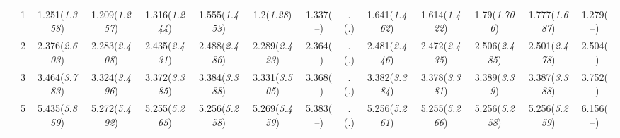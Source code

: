 \documentclass{article}
\begin{document}
\begin{table}[tbp]
{\begin{tabularx}{\textwidth}{lCCCCCCCCCCCCC}
&1&1.251\newline (\emph{1.358})&1.209\newline (\emph{1.257})&1.316\newline (\emph{1.244})&1.555\newline (\emph{1.453})&1.2\newline (\emph{1.28})&1.337\newline (--)&.\newline (\emph{.})&1.641\newline (\emph{1.462})&1.614\newline (\emph{1.422})&1.79\newline (\emph{1.706})&1.777\newline (\emph{1.687})&1.279\newline (--) \tabularnewline
&2&2.376\newline (\emph{2.603})&2.283\newline (\emph{2.408})&2.435\newline (\emph{2.431})&2.488\newline (\emph{2.486})&2.289\newline (\emph{2.423})&2.364\newline (--)&.\newline (\emph{.})&2.481\newline (\emph{2.446})&2.472\newline (\emph{2.435})&2.506\newline (\emph{2.485})&2.501\newline (\emph{2.478})&2.504\newline (--) \tabularnewline
&3&3.464\newline (\emph{3.783})&3.324\newline (\emph{3.496})&3.372\newline (\emph{3.385})&3.384\newline (\emph{3.388})&3.331\newline (\emph{3.505})&3.368\newline (--)&.\newline (\emph{.})&3.382\newline (\emph{3.384})&3.378\newline (\emph{3.381})&3.389\newline (\emph{3.39})&3.387\newline (\emph{3.388})&3.752\newline (--) \tabularnewline
&5&5.435\newline (\emph{5.859})&5.272\newline (\emph{5.492})&5.255\newline (\emph{5.265})&5.256\newline (\emph{5.258})&5.269\newline (\emph{5.459})&5.383\newline (--)&.\newline (\emph{.})&5.256\newline (\emph{5.261})&5.255\newline (\emph{5.266})&5.256\newline (\emph{5.258})&5.256\newline (\emph{5.259})&6.156\newline (--) \tabularnewline

\end{tabularx}}
\end{table}
\end{document}
